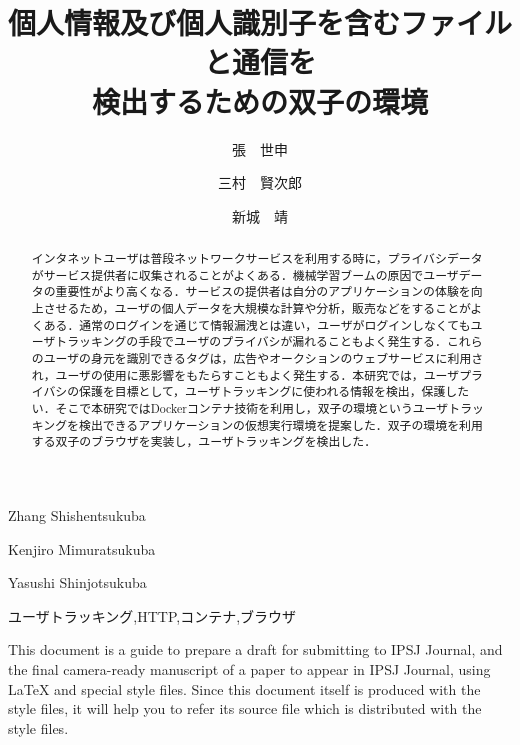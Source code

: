 \documentclass[submit]{ipsj}
\begin{document}
\title{個人情報及び個人識別子を含むファイルと通信を\\
検出するための双子の環境}




\author{張　世申}{Zhang Shishen}{tsukuba}
\author{三村　賢次郎}{Kenjiro Mimura}{tsukuba}
\author{新城　靖}{Yasushi Shinjo}{tsukuba}

\begin{abstract}
インタネットユーザは普段ネットワークサービスを利用する時に，プライバシデータがサービス提供者に収集されることがよくある．機械学習ブームの原因でユーザデータの重要性がより高くなる．サービスの提供者は自分のアプリケーションの体験を向上させるため，ユーザの個人データを大規模な計算や分析，販売などをすることがよくある．通常のログインを通じて情報漏洩とは違い，ユーザがログインしなくてもユーザトラッキングの手段でユーザのプライバシが漏れることもよく発生する．これらのユーザの身元を識別できるタグは，広告やオークションのウェブサービスに利用され，ユーザの使用に悪影響をもたらすこともよく発生する．本研究では，ユーザプライバシの保護を目標として，ユーザトラッキングに使われる情報を検出，保護したい．そこで本研究ではDockerコンテナ技術を利用し，双子の環境というユーザトラッキングを検出できるアプリケーションの仮想実行環境を提案した．双子の環境を利用する双子のブラウザを実装し，ユーザトラッキングを検出した．
\end{abstract}


\begin{jkeyword}
ユーザトラッキング,HTTP,コンテナ,ブラウザ
\end{jkeyword}

\begin{eabstract}
This document is a guide to prepare a draft for submitting to IPSJ
Journal, and the final camera-ready manuscript of a paper to appear in
IPSJ Journal, using {\LaTeX} and special style files.  Since this
document itself is produced with the style files, it will help you to
refer its source file which is distributed with the style files.
\end{eabstract}

\begin{ekeyword}
\end{ekeyword}

\maketitle
\end{document}
